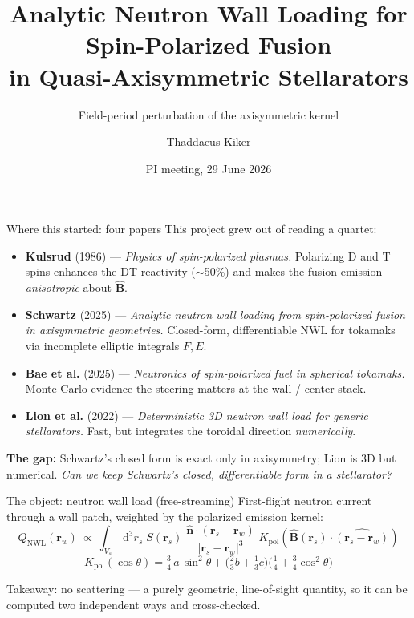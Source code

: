 \documentclass[aspectratio=169]{beamer}
\title{Analytic Neutron Wall Loading for Spin-Polarized Fusion\\in Quasi-Axisymmetric Stellarators}
\subtitle{Field-period perturbation of the axisymmetric kernel}
\author{Thaddaeus Kiker}
\institute{Columbia University --- Astronomy \& Fusion Research Center}
\date{PI meeting, 29 June 2026}
\newcommand{\rs}{\bm{r}_s}
\newcommand{\rw}{\bm{r}_w}
\newcommand{\nhat}{\hat{\bm{n}}}
\newcommand{\Bhat}{\hat{\bm{B}}}
\newcommand{\Kpol}{K_{\mathrm{pol}}}
\newcommand{\NWL}{\mathrm{NWL}}
\newcommand{\dd}{\,\mathrm{d}}
\begin{document}
\begin{frame}[plain]
  \titlepage
\end{frame}

\begin{frame}{Where this started: four papers}
  \small
  This project grew out of reading a quartet:
  \begin{itemize}
    \item \textbf{Kulsrud} (1986) --- \emph{Physics of spin-polarized plasmas.}
          Polarizing D and T spins enhances the DT reactivity ($\sim$50\%) and
          makes the fusion emission \emph{anisotropic} about $\Bhat$.
    \item \textbf{Schwartz} (2025) --- \emph{Analytic neutron wall loading from spin-polarized
          fusion in axisymmetric geometries.} Closed-form, differentiable NWL for tokamaks via
          incomplete elliptic integrals $F,E$.
    \item \textbf{Bae et al.} (2025) --- \emph{Neutronics of spin-polarized fuel in spherical
          tokamaks.} Monte-Carlo evidence the steering matters at the wall / center stack.
    \item \textbf{Lion et al.} (2022) --- \emph{Deterministic 3D neutron wall load for generic
          stellarators.} Fast, but integrates the toroidal direction \emph{numerically}.
  \end{itemize}
  \vspace{0.4em}
  \footnotesize\textbf{The gap:} Schwartz's closed form is exact only in axisymmetry; Lion is
  3D but numerical. \emph{Can we keep Schwartz's closed, differentiable form in a stellarator?}
\end{frame}

\begin{frame}{The object: neutron wall load (free-streaming)}
  First-flight neutron current through a wall patch, weighted by the polarized emission kernel:
  \begin{equation*}
    Q_{\NWL}(\rw)\ \propto\ \int_{V_s} \dd^3 r_s\; S(\rs)\;
    \frac{\nhat\cdot(\rs-\rw)}{\lvert \rs-\rw\rvert^{3}}\;
    \Kpol\!\left(\Bhat(\rs)\cdot\widehat{(\rs-\rw)}\right)
  \end{equation*}
  \vspace{0.2em}
  \begin{equation*}
    \Kpol(\cos\theta)=\tfrac{3}{4}\,a\,\sin^2\theta+\Big(\tfrac{2}{3}b+\tfrac{1}{3}c\Big)
    \Big(\tfrac{1}{4}+\tfrac{3}{4}\cos^2\theta\Big)
  \end{equation*}
  \vspace{0.4em}

  {\small Takeaway: no scattering --- a purely geometric, line-of-sight quantity, so it can be
  computed two independent ways and cross-checked.}
\end{frame}
\end{document}
